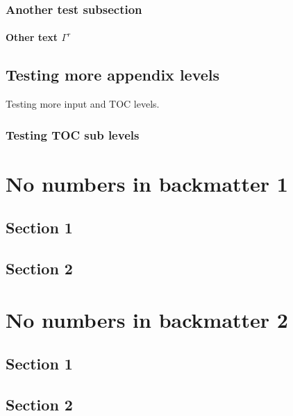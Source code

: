 \documentclass{book}
\begin{document}
\subsection{Another test subsection}

\subsubsection{Other text $\Gamma^{r}$}

\section{Testing more appendix levels}
Testing more input and TOC levels.

\subsection{Testing TOC sub levels}


\backmatter

\chapter{No numbers in backmatter 1}

\section{Section 1}

\section{Section 2}

\chapter{No numbers in backmatter 2}

\section{Section 1}

\section{Section 2}
\end{document}
